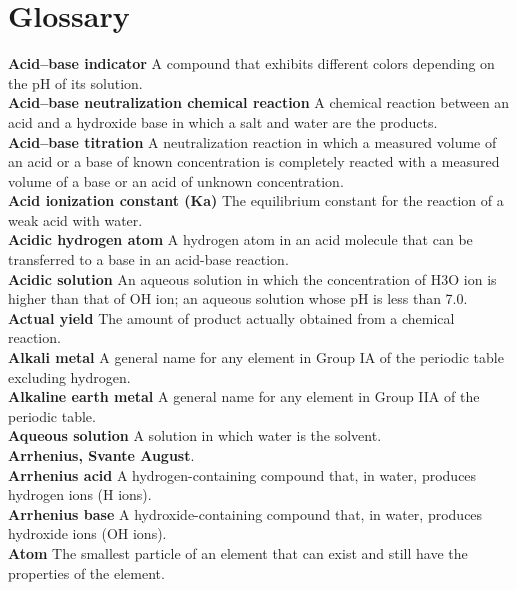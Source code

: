 \documentclass[10pt, roman]{article}
\begin{document}
\section{Glossary}
\begin{minipage}[c]{0.30\textwidth}
\textbf{Acid–base indicator} A compound that exhibits different colors depending on the pH of its solution. \\
\textbf{Acid–base neutralization chemical reaction} A chemical reaction between an acid and a hydroxide base in which a salt and water are the products. \\
\textbf{Acid–base titration} A neutralization reaction in which a measured volume of an acid or a base of known concentration is completely reacted with a measured volume of a base or an acid of unknown concentration. \\
\textbf{Acid ionization constant (Ka)} The equilibrium constant for the reaction of a weak acid with water. \\
\textbf{Acidic hydrogen atom} A hydrogen atom in an acid molecule that can be transferred to a base in an acid-base reaction. \\
\textbf{Acidic solution} An aqueous solution in which the concentration of H3O ion is higher than that of OH ion; an aqueous solution whose pH is less than 7.0. \\
\textbf{Actual yield} The amount of product actually obtained from a chemical reaction. \\
\textbf{Alkali metal} A general name for any element in Group IA of the periodic table excluding hydrogen. \\
\textbf{Alkaline earth metal} A general name for any element in Group IIA of the periodic table. \\
\textbf{Aqueous solution} A solution in which water is the solvent. \\
\textbf{Arrhenius, Svante August}. \\
\textbf{Arrhenius acid} A hydrogen-containing compound that, in water, produces hydrogen ions (H ions). \\
\textbf{Arrhenius base} A hydroxide-containing compound that, in water, produces hydroxide ions (OH ions). \\
\textbf{Atom} The smallest particle of an element that can exist and still have the properties of the element. \\
\end{minipage}%
\hfill
\end{document}
